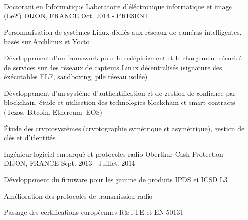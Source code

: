 ~\vspace{0.2cm}



\begin{cventries}

  \cventry
    {Doctorant en Informatique} %
    {Laboratoire d'éléctronique informatique et image (Le2i)} %
    {DIJON, FRANCE} %
    {Oct. 2014 - PRESENT} %
    {
      \begin{cvitems} %
      \item {Personnalisation de systèmes Linux dédiés aux réseaux de caméras intelligentes, basés sur Archlinux et Yocto}
      \item {Développement d'un framework pour le redéploiement et le chargement sécurisé de services sur des réseaux de capteurs Linux décentralisés (signature des éxécutables ELF, sandboxing, pile réseau isolée)}
      \item {Développement d'un système d'authentification et de gestion de confiance par blockchain, étude et utilisation des technologies blockchain et smart contracts (Tezos, Bitcoin, Ethereum, EOS)}
      \item {\'Etude des cryptosystèmes (cryptographie symétrique et asymétrique), gestion de clés et d'identités}
      \end{cvitems}
    }

  \cventry
    {Ingénieur logiciel embarqué et protocoles radio} %
    {Oberthur Cash Protection} %
    {DIJON, FRANCE} %
    {Sept. 2013 - Juillet. 2014} %
    {
      \begin{cvitems} %
      \item {Développement du firmware pour les gamme de produits IPDS et ICSD L3}
      \item {Amélioration des protocoles de transmission radio}
      \item {Passage des certifications européennes R\&TTE et EN 50131}
      \end{cvitems}
    }


\end{cventries}
